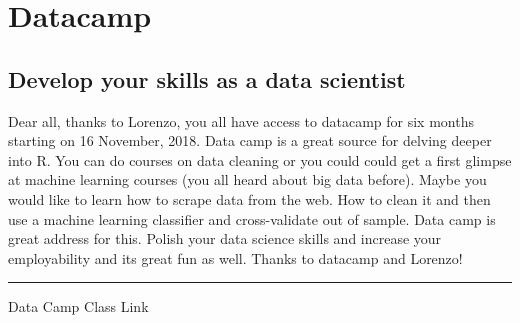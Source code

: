 \documentclass[]{article}
\theoremstyle{definition}
\theoremstyle{definition}
\theoremstyle{definition}
\theoremstyle{remark}
\begin{document}
\section{Datacamp}\label{datacamp}

\subsection{Develop your skills as a data
scientist}\label{develop-your-skills-as-a-data-scientist}

Dear all, thanks to Lorenzo, you all have access to datacamp for six
months starting on 16 November, 2018. Data camp is a great source for
delving deeper into R. You can do courses on data cleaning or you could
could get a first glimpse at machine learning courses (you all heard
about big data before). Maybe you would like to learn how to scrape data
from the web. How to clean it and then use a machine learning classifier
and cross-validate out of sample. Data camp is great address for this.
Polish your data science skills and increase your employability and its
great fun as well. Thanks to datacamp and Lorenzo!

\begin{center}\rule{0.5\linewidth}{\linethickness}\end{center}

Data Camp Class Link
\end{document}
